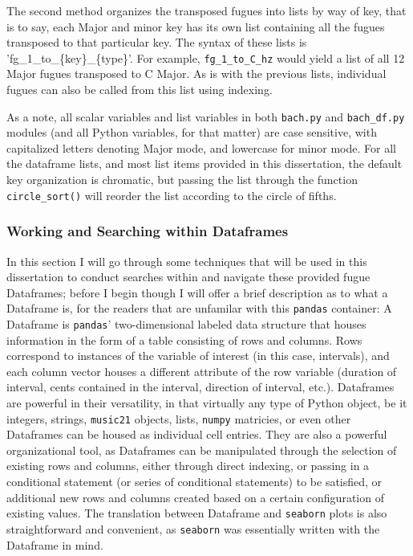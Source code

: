 The second method organizes the transposed fugues into lists by way of
key, that is to say, each Major and minor key has its own list
containing all the fugues transposed to that particular key. The syntax
of these lists is 'fg\_1\_to\_\{key\}\_\{type\}'. For example,
\texttt{fg\_1\_to\_C\_hz} would yield a list of all 12 Major fugues
transposed to C Major. As is with the previous lists, individual fugues
can also be called from this list using indexing.

As a note, all scalar variables and list variables in both
\texttt{bach.py} and \texttt{bach\_df.py} modules (and all Python
variables, for that matter) are case sensitive, with capitalized letters
denoting Major mode, and lowercase for minor mode. For all the dataframe
lists, and most list items provided in this dissertation, the default
key organization is chromatic, but passing the list through the function
\texttt{circle\_sort()} will reorder the list according to the circle of
fifths.

\subsubsection{Working and Searching within
Dataframes}\label{working-and-searching-within-dataframes}

In this section I will go through some techniques that will be used in
this dissertation to conduct searches within and navigate these provided
fugue Dataframes; before I begin though I will offer a brief description
as to what a Dataframe is, for the readers that are unfamilar with this
\texttt{pandas} container: A Dataframe is \texttt{pandas}'
two-dimensional labeled data structure that houses information in the
form of a table consisting of rows and columns. Rows correspond to
instances of the variable of interest (in this case, intervals), and
each column vector houses a different attribute of the row variable
(duration of interval, cents contained in the interval, direction of
interval, etc.). Dataframes are powerful in their versatility, in that
virtually any type of Python object, be it integers, strings,
\texttt{music21} objects, lists, \texttt{numpy} matricies, or even other
Dataframes can be housed as individual cell entries. They are also a
powerful organizational tool, as Dataframes can be manipulated through
the selection of existing rows and columns, either through direct
indexing, or passing in a conditional statement (or series of
conditional statements) to be satisfied, or additional new rows and
columns created based on a certain configuration of existing values. The
translation between Dataframe and \texttt{seaborn} plots is also
straightforward and convenient, as \texttt{seaborn} was essentially
written with the Dataframe in mind.

